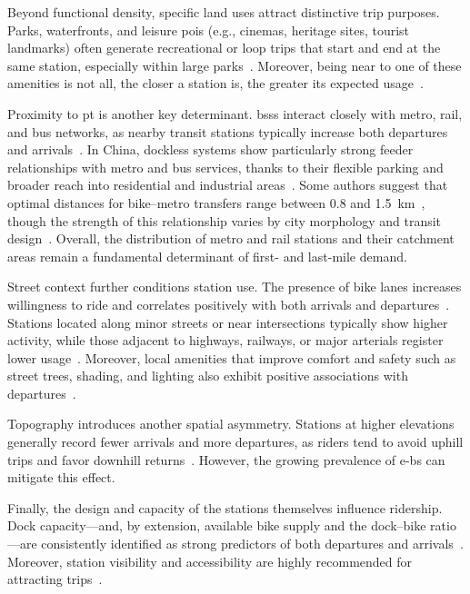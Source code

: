         Beyond functional density, specific land uses attract distinctive trip purposes. Parks, waterfronts, and leisure \acp{poi} (e.g., cinemas, heritage sites, tourist landmarks) often generate recreational or loop trips that start and end at the same station, especially within large parks~\cite{Tran2015, MateoBabiano2016}. Moreover, being near to one of these amenities is not all, the closer a station is, the greater its expected usage~\cite{Wang2016}.

        Proximity to \ac{pt} is another key determinant. \acp{bss} interact closely with metro, rail, and bus networks, as nearby transit stations typically increase both departures and arrivals~\cite{Tran2015, Lee2021}. In China, dockless systems show particularly strong feeder relationships with metro and bus services, thanks to their flexible parking and broader reach into residential and industrial areas~\cite{Guo2020, Guo2021Dockless, Ji2020}. Some authors suggest that optimal distances for bike–metro transfers range between 0.8 and 1.5~km~\cite{Zhao2017}, though the strength of this relationship varies by city morphology and transit design~\cite{Lin2018}. Overall, the distribution of metro and rail stations and their catchment areas remain a fundamental determinant of first- and last-mile demand.

        Street context further conditions station use. The presence of bike lanes increases willingness to ride and correlates positively with both arrivals and departures~\cite{ElAssi2017}. Stations located along minor streets or near intersections typically show higher activity, while those adjacent to highways, railways, or major arterials register lower usage~\cite{FaghihImani2014, FaghihImani2016, FaghihImani2016SpatioTemporal, ElAssi2017}. Moreover, local amenities that improve comfort and safety such as street trees, shading, and lighting also exhibit positive associations with departures~\cite{Liu2019}.

        Topography introduces another spatial asymmetry. Stations at higher elevations generally record fewer arrivals and more departures, as riders tend to avoid uphill trips and favor downhill returns~\cite{Morency2015, MateoBabiano2016}. However, the growing prevalence of \acp{e-b} can mitigate this effect.

        Finally, the design and capacity of the stations themselves influence ridership. Dock capacity—and, by extension, available bike supply and the dock–bike ratio—are consistently identified as strong predictors of both departures and arrivals~\cite{ElAssi2017, Yang2020, Zhao2021}. Moreover, station visibility and accessibility are highly recommended for attracting trips~\cite{Ferrando2007, Yanocha2018, CROW2006}.


